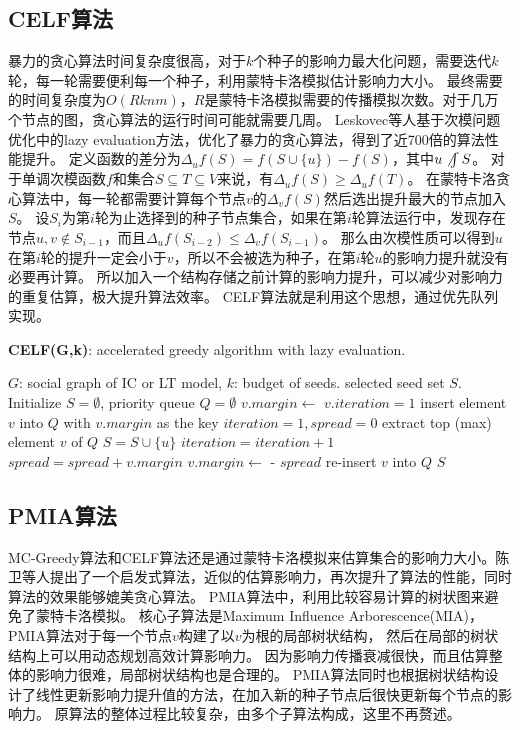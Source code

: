 \subsection{CELF算法}
暴力的贪心算法时间复杂度很高，对于$k$个种子的影响力最大化问题，需要迭代$k$轮，每一轮需要便利每一个种子，利用蒙特卡洛模拟估计影响力大小。
最终需要的时间复杂度为$O(Rknm)$，$R$是蒙特卡洛模拟需要的传播模拟次数。对于几万个节点的图，贪心算法的运行时间可能就需要几周。
Leskovec等人\cite{Leskovec2007celf}基于次模问题优化中的lazy evaluation方法，优化了暴力的贪心算法，得到了近700倍的算法性能提升。
定义函数的差分为$\Delta_u f(S) = f(S \cup \{u\}) - f(S)$，其中$u \not\int S$。
对于单调次模函数$f$和集合$S \subseteq T \subseteq V$来说，有$\Delta_u f(S) \geq \Delta_u f(T)$。
在蒙特卡洛贪心算法中，每一轮都需要计算每个节点$v$的$\Delta_v f(S)$然后选出提升最大的节点加入$S$。
设$S_i$为第$i$轮为止选择到的种子节点集合，如果在第$i$轮算法运行中，发现存在节点$u,v \not\in S_{i-1}$，而且$\Delta_u f(S_{i-2}) \leq \Delta_v f(S_{i-1})$。
那么由次模性质可以得到$u$在第$i$轮的提升一定会小于$v$，所以不会被选为种子，在第$i$轮$u$的影响力提升就没有必要再计算。
所以加入一个结构存储之前计算的影响力提升，可以减少对影响力的重复估算，极大提升算法效率。
CELF算法就是利用这个思想，通过优先队列实现。

\begin{algorithm}[h]
	\caption{\textbf{CELF(G,k)}: accelerated greedy algorithm with lazy evaluation.}
	\label{alg:celf} 
	\begin{algorithmic}[1]
		\Require $G$: social graph of IC or LT model, $k$: budget of seeds.
		\Ensure selected seed set $S$.
		\State Initialize $S = \emptyset$, priority queue $Q = \emptyset$
			\State $v.margin \gets$ 
			\State $v.iteration = 1$
			\State insert element $v$ into $Q$ with $v.margin$ as the key
		\EndFor
		\State $iteration = 1, spread = 0$
			\State extract top (max) element $v$ of $Q$
				\State $S = S \cup \{u\}$
				\State $iteration = iteration+1$
				\State $spread = spread + v.margin$
			\Else
				\State $v.margin \gets$  - $spread$
				\State re-insert $v$ into $Q$
			\EndIf
		\EndWhile
		\State \Return $S$
	\end{algorithmic} 
\end{algorithm}

\subsection{PMIA算法}
MC-Greedy算法和CELF算法还是通过蒙特卡洛模拟来估算集合的影响力大小。陈卫等人提出了一个启发式算法，近似的估算影响力，再次提升了算法的性能，同时算法的效果能够媲美贪心算法。
PMIA算法\cite{chen2010sharpphard}中，利用比较容易计算的树状图来避免了蒙特卡洛模拟。
核心子算法是Maximum Influence Arborescence(MIA)，PMIA算法对于每一个节点$v$构建了以$v$为根的局部树状结构，
然后在局部的树状结构上可以用动态规划高效计算影响力。
因为影响力传播衰减很快，而且估算整体的影响力很难，局部树状结构也是合理的。
PMIA算法同时也根据树状结构设计了线性更新影响力提升值的方法，在加入新的种子节点后很快更新每个节点的影响力。
原算法的整体过程比较复杂，由多个子算法构成，这里不再赘述。

